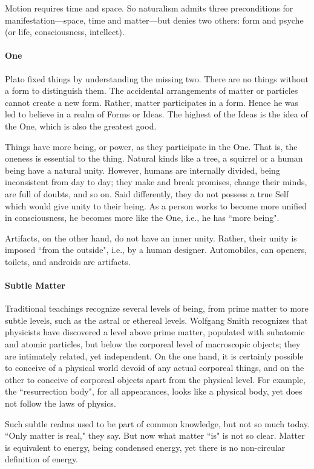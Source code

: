 Motion requires time and space. So naturalism admits three preconditions for manifestation—space, time and matter—but denies two others: form and psyche (or life, consciousness, intellect).

\paragraph{One}
Plato fixed things by understanding the missing two. There are no things without a form to distinguish them. The accidental arrangements of matter or particles cannot create a new form. Rather, matter participates in a form. Hence he was led to believe in a realm of Forms or Ideas. The highest of the Ideas is the idea of the One, which is also the greatest good.

Things have more being, or power, as they participate in the One. That is, the oneness is essential to the thing. Natural kinds like a tree, a squirrel or a human being have a natural unity. However, humans are internally divided, being inconsistent from day to day; they make and break promises, change their minds, are full of doubts, and so on. Said differently, they do not possess a true Self which would give unity to their being. As a person works to become more unified in consciousness, he becomes more like the One, i.e., he has ``more being".

Artifacts, on the other hand, do not have an inner unity. Rather, their unity is imposed ``from the outside", i.e., by a human designer. Automobiles, can openers, toilets, and androids are artifacts.

\paragraph{Subtle Matter}
Traditional teachings recognize several levels of being, from prime matter to more subtle levels, such as the astral or ethereal levels. Wolfgang Smith recognizes that physicists have discovered a level above prime matter, populated with subatomic and atomic particles, but below the corporeal level of macroscopic objects; they are intimately related, yet independent. On the one hand, it is certainly possible to conceive of a physical world devoid of any actual corporeal things, and on the other to conceive of corporeal objects apart from the physical level. For example, the ``resurrection body", for all appearances, looks like a physical body, yet does not follow the laws of physics.

Such subtle realms used to be part of common knowledge, but not so much today. ``Only matter is real," they say. But now what matter ``is" is not so clear. Matter is equivalent to energy, being condensed energy, yet there is no non-circular definition of energy.

